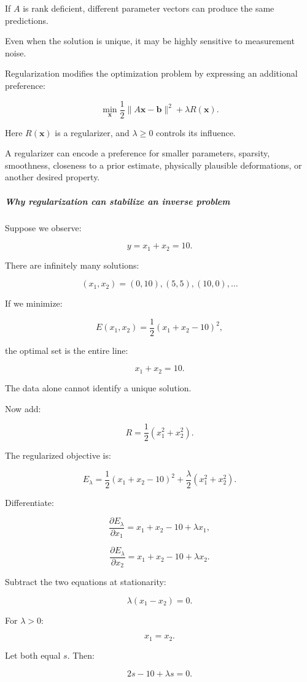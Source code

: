 If \(A\) is rank deficient, different parameter vectors can produce the same predictions.

Even when the solution is unique, it may be highly sensitive to measurement noise.

Regularization modifies the optimization problem by expressing an additional preference:

\[
\boxed{ \min_{\mathbf x} \frac12\|A\mathbf x-\mathbf b\|^2 + \lambda R(\mathbf x) }.
\]

Here \(R(\mathbf x)\) is a regularizer, and \(\lambda\ge0\) controls its influence.

A regularizer can encode a preference for smaller parameters, sparsity, smoothness, closeness to a prior estimate, physically plausible deformations, or another desired property.

\subparagraph{Why regularization can stabilize an inverse problem}\label{why-regularization-can-stabilize-an-inverse-problem}

Suppose we observe:

\[
y=x_1+x_2=10.
\]

There are infinitely many solutions:

\[
(x_1,x_2)=(0,10),(5,5),(10,0),\ldots
\]

If we minimize:

\[
E(x_1,x_2)=\frac12(x_1+x_2-10)^2,
\]

the optimal set is the entire line:

\[
x_1+x_2=10.
\]

The data alone cannot identify a unique solution.

Now add:

\[
R=\frac12(x_1^2+x_2^2).
\]

The regularized objective is:

\[
E_\lambda= \frac12(x_1+x_2-10)^2 +\frac\lambda2(x_1^2+x_2^2).
\]

Differentiate:

\[
\frac{\partial E_\lambda}{\partial x_1} = x_1+x_2-10+\lambda x_1,
\]

\[
\frac{\partial E_\lambda}{\partial x_2} = x_1+x_2-10+\lambda x_2.
\]

Subtract the two equations at stationarity:

\[
\lambda(x_1-x_2)=0.
\]

For \(\lambda>0\):

\[
x_1=x_2.
\]

Let both equal \(s\). Then:

\[
2s-10+\lambda s=0.
\]

